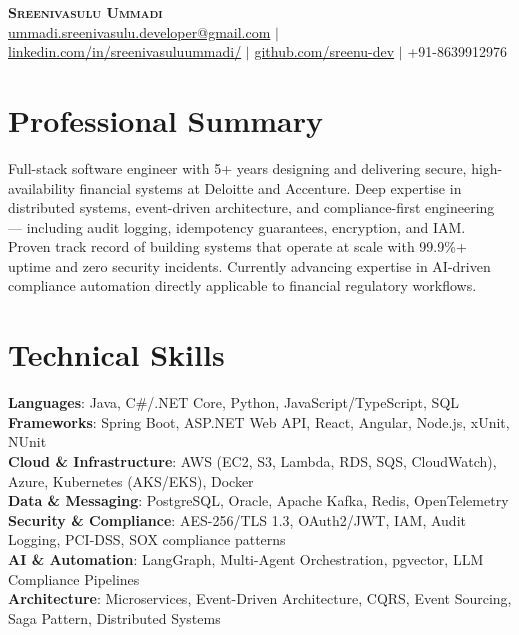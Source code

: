 \documentclass[letterpaper,11pt]{article}
\begin{document}
\begin{center}
    \textbf{\Huge \scshape Sreenivasulu Ummadi} \\ \vspace{5pt}
    \small \href{mailto:ummadi.sreenivasulu.developer@gmail.com}{ummadi.sreenivasulu.developer@gmail.com} $|$
    \href{https://www.linkedin.com/in/sreenivasuluummadi/}{linkedin.com/in/sreenivasuluummadi/} $|$
    \href{https://github.com/sreenu-dev}{github.com/sreenu-dev} $|$
    \small +91-8639912976
\end{center}

\section{Professional Summary}
\small{Full-stack software engineer with 5+ years designing and delivering secure, high-availability financial systems at Deloitte and Accenture. Deep expertise in distributed systems, event-driven architecture, and compliance-first engineering --- including audit logging, idempotency guarantees, encryption, and IAM. Proven track record of building systems that operate at scale with 99.9\%+ uptime and zero security incidents. Currently advancing expertise in AI-driven compliance automation directly applicable to financial regulatory workflows.}

\section{Technical Skills}
 \begin{itemize}[leftmargin=0.15in, label={}]
    \small{\item{
     \textbf{Languages}{: Java, C\#/.NET Core, Python, JavaScript/TypeScript, SQL} \\
     \textbf{Frameworks}{: Spring Boot, ASP.NET Web API, React, Angular, Node.js, xUnit, NUnit} \\
     \textbf{Cloud \& Infrastructure}{: AWS (EC2, S3, Lambda, RDS, SQS, CloudWatch), Azure, Kubernetes (AKS/EKS), Docker} \\
     \textbf{Data \& Messaging}{: PostgreSQL, Oracle, Apache Kafka, Redis, OpenTelemetry} \\
     \textbf{Security \& Compliance}{: AES-256/TLS 1.3, OAuth2/JWT, IAM, Audit Logging, PCI-DSS, SOX compliance patterns} \\
     \textbf{AI \& Automation}{: LangGraph, Multi-Agent Orchestration, pgvector, LLM Compliance Pipelines} \\
     \textbf{Architecture}{: Microservices, Event-Driven Architecture, CQRS, Event Sourcing, Saga Pattern, Distributed Systems}
    }}
 \end{itemize}
\end{document}
